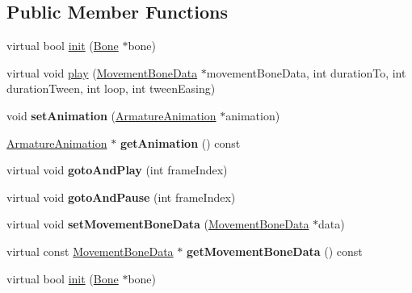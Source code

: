 \subsection*{Public Member Functions}
\begin{DoxyCompactItemize}
\item 
virtual bool \hyperlink{classcocostudio_1_1Tween_afca0d0866505e0a3c747277c1df8a69d}{init} (\hyperlink{classcocostudio_1_1Bone}{Bone} $\ast$bone)
\item 
virtual void \hyperlink{classcocostudio_1_1Tween_a7d10c3c326a1cda2d53c60f1cf4a7e41}{play} (\hyperlink{classcocostudio_1_1MovementBoneData}{Movement\+Bone\+Data} $\ast$movement\+Bone\+Data, int duration\+To, int duration\+Tween, int loop, int tween\+Easing)
\item 
\mbox{\label{classcocostudio_1_1Tween_a9f35b2207d2e1d1bab93370532fdd12f}} 
void {\bfseries set\+Animation} (\hyperlink{classcocostudio_1_1ArmatureAnimation}{Armature\+Animation} $\ast$animation)
\item 
\mbox{\label{classcocostudio_1_1Tween_ab47d9af1042174dccbf8d529a859cc1b}} 
\hyperlink{classcocostudio_1_1ArmatureAnimation}{Armature\+Animation} $\ast$ {\bfseries get\+Animation} () const
\item 
\mbox{\label{classcocostudio_1_1Tween_aa18ed561e3a16261966e75d00afe1f0e}} 
virtual void {\bfseries goto\+And\+Play} (int frame\+Index)
\item 
\mbox{\label{classcocostudio_1_1Tween_ab6c4df991fb8ab0d25501904d0cc4ed1}} 
virtual void {\bfseries goto\+And\+Pause} (int frame\+Index)
\item 
\mbox{\label{classcocostudio_1_1Tween_a547c37fb52d21a77009d0b74216cf2d1}} 
virtual void {\bfseries set\+Movement\+Bone\+Data} (\hyperlink{classcocostudio_1_1MovementBoneData}{Movement\+Bone\+Data} $\ast$data)
\item 
\mbox{\label{classcocostudio_1_1Tween_ac897f94d5d502a48e19398ebffd45b23}} 
virtual const \hyperlink{classcocostudio_1_1MovementBoneData}{Movement\+Bone\+Data} $\ast$ {\bfseries get\+Movement\+Bone\+Data} () const
\item 
virtual bool \hyperlink{classcocostudio_1_1Tween_a96ae9f0e84c93c8f65506347e7ad11b3}{init} (\hyperlink{classcocostudio_1_1Bone}{Bone} $\ast$bone)

\end{DoxyCompactItemize}
